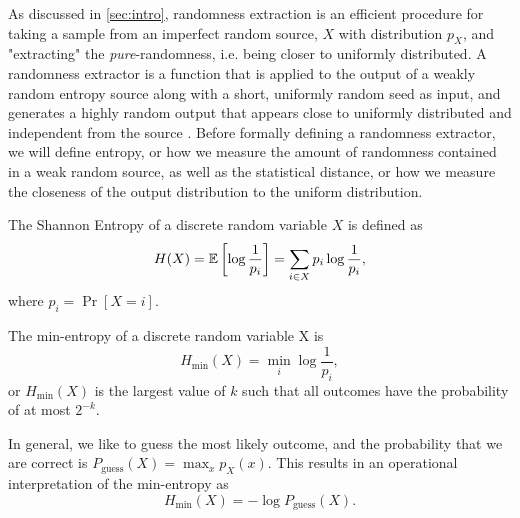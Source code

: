 As discussed in \autoref{sec:intro}, randomness extraction is an efficient procedure for taking a sample from an imperfect random source, $X$ with distribution $p_X$, and "extracting" the \textit{pure}-randomness, i.e. being closer to uniformly distributed. A randomness extractor is a function that is applied to the output of a weakly random entropy source along with a short, uniformly random seed as input, and generates a highly random output that appears close to uniformly distributed and independent from the source \cite{vadhan2012}. Before formally defining a randomness extractor, we will define entropy, or how we measure the amount of randomness contained in a weak random source, as well as the statistical distance, or how we measure the closeness of the output distribution to the uniform distribution.

\begin{definition}\label{def:entropy}
    The Shannon Entropy of a discrete random variable $X$ is defined as\[
        H(X) = \mathbb{E}\left[\log \frac{1}{p_i}\right] = \sum_{i \in X}p_i \log \frac{1}{p_i},
    \] where $p_i = \Pr[X=i]$.
\end{definition}

\begin{definition}\label{def:min_entropy}
    The min-entropy of a discrete random variable X is
    \[
        H_{\min}(X) = \min_{i} \log \frac{1}{p_i},
    \] or $H_{\min}(X)$ is the largest value of $k$ such that all outcomes have the probability of at most $2^{-k}$. 
    
In general, we like to guess the most likely outcome, and the probability that we are correct is $P_{\text{guess}}(X) = \max_x p_X(x)$. This results in an operational interpretation of the min-entropy as 
    \[
        H_{\min}(X) = -\log P_{\text{guess}}(X).
    \]
\end{definition}

